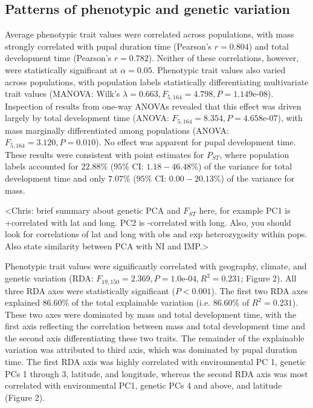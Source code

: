\documentclass[smallextended]{svjour3}
\begin{document}
\subsection*{Patterns of phenotypic and genetic variation} Average phenotypic
trait values were correlated across populations, with mass strongly correlated
with pupal duration time (Pearson's $r = 0.804$) and total development time
(Pearson's $r = 0.782$).  Neither of these correlations, however, were
statistically significant at $\alpha = 0.05$. Phenotypic trait values also
varied across populations, with population labels statistically differentiating
multivariate trait values (MANOVA: Wilk's $\lambda = 0.663, F_{5,164} = 4.798,P
=
1.149$e-$08$). Inspection of results from one-way ANOVAs revealed that this
effect was driven largely by total development time (ANOVA: $F_{5,164} =
8.354,P =
4.658$e-$07$), with mass marginally differentiated among populations (ANOVA:
$F_{5,164} = 3.120,P = 0.010$). No effect was apparent for pupal development
time. These results were consistent with point estimates for $P_{ST}$, where
population labels accounted for $22.88\%$ ($95\%$ CI: $1.18 - 46.48\%$) of the
variance for total development time and only $7.07\%$ ($95\%$ CI: $0.00 -
20.13\%$) of the variance for mass.

<Chris: brief summary about genetic PCA and $F_{ST}$ here, for example PC1 is
+correlated with lat and long. PC2 is -correlated with long. Also, you should
look for correlations of lat and long with obs and exp heterozygosity within
pops. Also state similarity between PCA with NI and IMP.>

Phenotypic trait values were significantly correlated with geography, climate,
and genetic variation (RDA: $F_{19,150} = 2.369, P = 1.0$e-$04, R^2 = 0.231$;
Figure 2). All three RDA axes were statistically significant ($P < 0.001$). 
The first two RDA axes explained $86.60\%$ of the total
explainable variation (i.e. $86.60\%$ of $R^2 = 0.231$). These two axes were
dominated by mass and total development time, with the first axis reflecting
the
correlation between mass and total development time and the second axis
differentiating these two traits. The remainder of the explainable variation
was
attributed to third axis, which was dominated by pupal duration time. The first
RDA axis was highly correlated with environmental PC 1, genetic PCs 1 through
3,
latitude, and longitude, whereas the second RDA axis was most correlated with
environmental PC1, genetic PCs 4 and above, and latitude (Figure 2).
\end{document}
